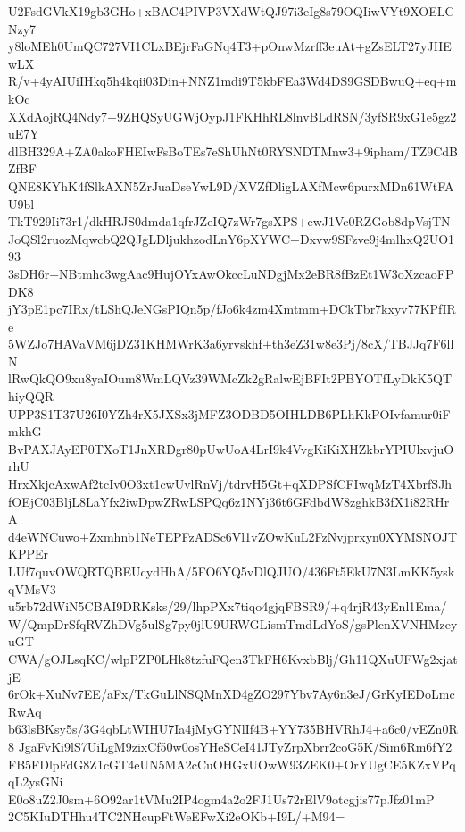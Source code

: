 U2FsdGVkX19gb3GHo+xBAC4PIVP3VXdWtQJ97i3eIg8s79OQIiwVYt9XOELCNzy7
y8loMEh0UmQC727VI1CLxBEjrFaGNq4T3+pOnwMzrff3euAt+gZsELT27yJHEwLX
R/v+4yAIUiIHkq5h4kqii03Din+NNZ1mdi9T5kbFEa3Wd4DS9GSDBwuQ+eq+mkOc
XXdAojRQ4Ndy7+9ZHQSyUGWjOypJ1FKHhRL8lnvBLdRSN/3yfSR9xG1e5gz2uE7Y
dlBH329A+ZA0akoFHEIwFsBoTEs7eShUhNt0RYSNDTMnw3+9ipham/TZ9CdBZfBF
QNE8KYhK4fSlkAXN5ZrJuaDseYwL9D/XVZfDligLAXfMcw6purxMDn61WtFAU9bl
TkT929Ii73r1/dkHRJS0dmda1qfrJZeIQ7zWr7gsXPS+ewJ1Vc0RZGob8dpVsjTN
JoQSl2ruozMqwcbQ2QJgLDljukhzodLnY6pXYWC+Dxvw9SFzve9j4mlhxQ2UO193
3sDH6r+NBtmhc3wgAac9HujOYxAwOkccLuNDgjMx2eBR8fBzEt1W3oXzcaoFPDK8
jY3pE1pc7IRx/tLShQJeNGsPIQn5p/fJo6k4zm4Xmtmm+DCkTbr7kxyv77KPfIRe
5WZJo7HAVaVM6jDZ31KHMWrK3a6yrvskhf+th3eZ31w8e3Pj/8cX/TBJJq7F6llN
lRwQkQO9xu8yaIOum8WmLQVz39WMcZk2gRalwEjBFIt2PBYOTfLyDkK5QThiyQQR
UPP3S1T37U26I0YZh4rX5JXSx3jMFZ3ODBD5OIHLDB6PLhKkPOIvfamur0iFmkhG
BvPAXJAyEP0TXoT1JnXRDgr80pUwUoA4LrI9k4VvgKiKiXHZkbrYPIUlxvjuOrhU
HrxXkjcAxwAf2tcIv0O3xt1cwUvlRnVj/tdrvH5Gt+qXDPSfCFIwqMzT4XbrfSJh
fOEjC03BljL8LaYfx2iwDpwZRwLSPQq6z1NYj36t6GFdbdW8zghkB3fX1i82RHrA
d4eWNCuwo+Zxmhnb1NeTEPFzADSc6Vl1vZOwKuL2FzNvjprxyn0XYMSNOJTKPPEr
LUf7quvOWQRTQBEUcydHhA/5FO6YQ5vDlQJUO/436Ft5EkU7N3LmKK5yskqVMsV3
u5rb72dWiN5CBAI9DRKsks/29/lhpPXx7tiqo4gjqFBSR9/+q4rjR43yEnl1Ema/
W/QmpDrSfqRVZhDVg5ulSg7py0jlU9URWGLismTmdLdYoS/gsPlcnXVNHMzeyuGT
CWA/gOJLsqKC/wlpPZP0LHk8tzfuFQen3TkFH6KvxbBlj/Gh11QXuUFWg2xjatjE
6rOk+XuNv7EE/aFx/TkGuLlNSQMnXD4gZO297Ybv7Ay6n3eJ/GrKyIEDoLmcRwAq
b63lsBKsy5s/3G4qbLtWIHU7Ia4jMyGYNlIf4B+YY735BHVRhJ4+a6c0/vEZn0R8
JgaFvKi9lS7UiLgM9zixCf50w0osYHeSCeI41JTyZrpXbrr2coG5K/Sim6Rm6fY2
FB5FDlpFdG8Z1cGT4eUN5MA2cCuOHGxUOwW93ZEK0+OrYUgCE5KZxVPqqL2ysGNi
E0o8uZ2J0sm+6O92ar1tVMu2IP4ogm4a2o2FJ1Us72rElV9otcgjis77pJfz01mP
2C5KIuDTHhu4TC2NHcupFtWeEFwXi2eOKb+I9L/+M94=
